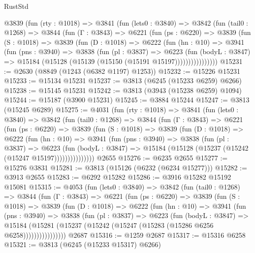 \begin{lexlean}{RustStd}
\begin{coremodule}
{\begin{coremodule}
{{{{{{{{{{{{{{{{{{{{{{{{{{{{{{{{{{{    @3839
      (fun (rty : @1018) =>
      @3841
        (fun (lets0 : @3840) =>
        @3842
          (fun (tail0 : @1268) =>
          @3844
            (fun (Γ : @3843) =>
            @6221
              (fun (ps : @6220) =>
              @3839
                (fun (S : @1018) =>
                @3839
                  (fun (D : @1018) =>
                  @6222
                    (fun (hn : @10) =>
                    @3941
                      (fun (pns : @3940) =>
                      @3838
                        (fun (pl : @3837) =>
                        @6223
                          (fun (bodyL : @3847) =>
                          @15184 (@15128 (@15139 (@15150 (@15191 @15197))))))))))))))))
@15231 := @2630 (@8849 (@1243 (@6382 @1197) @1253))
@15232 := @15226 @15231
@15233 := @15134 @15231
@15237 := @3813 (@6245 (@15233 @6259) @6266)
@15238 := @15145 @15231
@15242 := @3813 (@3943 (@15238 @6259) @1094)
@15244 := @15187 (@3900 @15231)
@15245 := @3884 @15244
@15247 := @3813 (@15245 @6289)
@15275 := @4031
    (fun (rty : @1018) =>
    @3841
      (fun (lets0 : @3840) =>
      @3842
        (fun (tail0 : @1268) =>
        @3844
          (fun (Γ : @3843) =>
          @6221
            (fun (ps : @6220) =>
            @3839
              (fun (S : @1018) =>
              @3839
                (fun (D : @1018) =>
                @6222
                  (fun (hn : @10) =>
                  @3941
                    (fun (pns : @3940) =>
                    @3838
                      (fun (pl : @3837) =>
                      @6223
                        (fun (bodyL : @3847) =>
                        @15184 (@15128 (@15237 (@15242 (@15247 @15197)))))))))))))))
    @2655
@15276 := @6235 @2655
@15277 := @15276 @3831
@15281 := @3813 (@15126 (@6232 (@6234 @15277)))
@15282 := @3913 @2655
@15283 := @6292 @15282
@15286 := @3916 @15282 @15192 @15081
@15315 := @4053
    (fun (lets0 : @3840) =>
    @3842
      (fun (tail0 : @1268) =>
      @3844
        (fun (Γ : @3843) =>
        @6221
          (fun (ps : @6220) =>
          @3839
            (fun (S : @1018) =>
            @3839
              (fun (D : @1018) =>
              @6222
                (fun (hn : @10) =>
                @3941
                  (fun (pns : @3940) =>
                  @3838
                    (fun (pl : @3837) =>
                    @6223
                      (fun (bodyL : @3847) =>
                      @15184
                        (@15281 (@15237 (@15242 (@15247 (@15283 (@15286 @6256 @6258))))))))))))))))
    @2687
@15316 := @1259 @2687
@15317 := @15316 @6258
@15321 := @3813 (@6245 (@15233 @15317) @6266)
}}}}}}}}}}}}}}}}}}}}}}}}}}}}}}}}}}}
\end{coremodule}}
\end{coremodule}
\end{lexlean}
